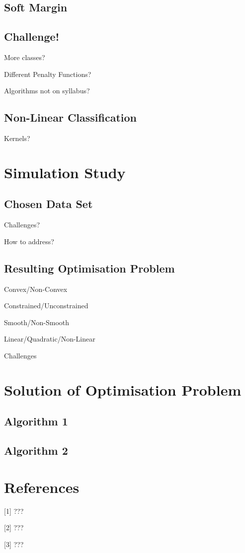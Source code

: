 \documentclass[10pt, a4paper]{amsart}
\begin{document}
\subsection{Soft Margin}

\subsection{Challenge!}\hfill

More classes?

Different Penalty Functions?

Algorithms not on syllabus?

\subsection{Non-Linear Classification}\hfill

Kernels?


\section{Simulation Study}

\subsection{Chosen Data Set}\hfill

Challenges?

How to address?

\subsection{Resulting Optimisation Problem}\hfill

Convex/Non-Convex

Constrained/Unconstrained

Smooth/Non-Smooth

Linear/Quadratic/Non-Linear

Challenges


\section{Solution of Optimisation Problem}

\subsection{Algorithm 1}\hfill

\subsection{Algorithm 2}\hfill


\section{References}

[1] ???

[2] ???

[3] ???
\end{document}
